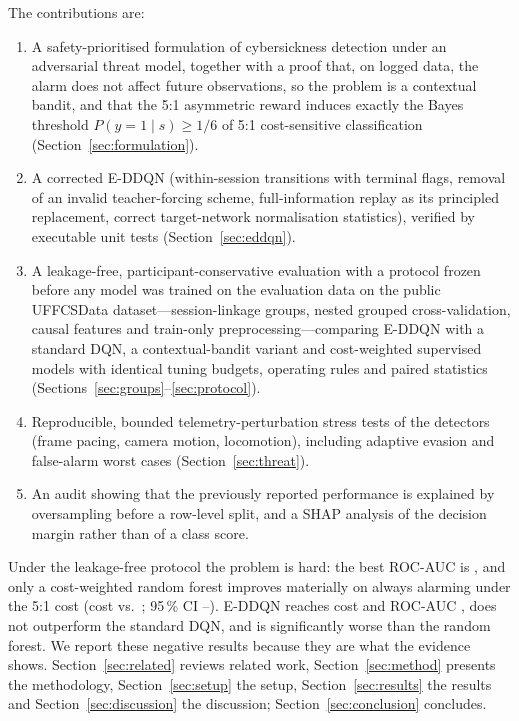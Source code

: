 The contributions are:
\begin{enumerate}
\item A safety-prioritised formulation of cybersickness detection under an adversarial threat model, together with a proof that, on logged data, the alarm does not affect future observations, so the problem is a contextual bandit, and that the 5:1 asymmetric reward induces exactly the Bayes threshold $P(y=1\mid s)\ge1/6$ of 5:1 cost-sensitive classification (Section~\ref{sec:formulation}).
\item A corrected E-DDQN (within-session transitions with terminal flags, removal of an invalid teacher-forcing scheme, full-information replay as its principled replacement, correct target-network normalisation statistics), verified by executable unit tests (Section~\ref{sec:eddqn}).
\item A leakage-free, participant-conservative evaluation with a protocol frozen before any model was trained on the evaluation data on the public UFFCSData dataset---session-linkage groups, nested grouped cross-validation, causal features and train-only preprocessing---comparing E-DDQN with a standard DQN, a contextual-bandit variant and cost-weighted supervised models with identical tuning budgets, operating rules and paired statistics (Sections~\ref{sec:groups}--\ref{sec:protocol}).
\item Reproducible, bounded telemetry-perturbation stress tests of the detectors (frame pacing, camera motion, locomotion), including adaptive evasion and false-alarm worst cases (Section~\ref{sec:threat}).
\item An audit showing that the previously reported performance is explained by oversampling before a row-level split, and a SHAP analysis of the decision margin rather than of a class score.
\end{enumerate}

Under the leakage-free protocol the problem is hard: the best ROC-AUC is \HGBCostRocAucMean{}, and only a cost-weighted random forest improves materially on always alarming under the 5:1 cost (cost \RFCostCostMean{} vs.\ \AlwaysCost; 95\,\% CI \RFCICostLo--\RFCICostHi). E-DDQN reaches cost \EDDQNCostCostMean{} and ROC-AUC \EDDQNCostRocAucMean{}, does not outperform the standard DQN, and is significantly worse than the random forest. We report these negative results because they are what the evidence shows. Section~\ref{sec:related} reviews related work, Section~\ref{sec:method} presents the methodology, Section~\ref{sec:setup} the setup, Section~\ref{sec:results} the results and Section~\ref{sec:discussion} the discussion; Section~\ref{sec:conclusion} concludes.
